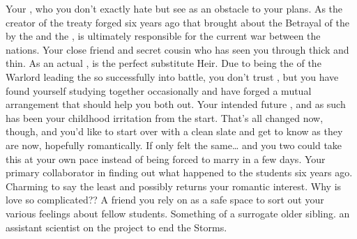 \documentclass[char]{GL2020}
\begin{document}
\begin{contacts}
    \contact{\cDiplomat{}} Your \cDiplomat{\auncle}, who you don’t exactly hate but see as an obstacle to your plans. As the creator of the treaty forged six years ago that brought about the Betrayal of the \pShip{} by the \pTech{} and the \pFarm{}, \cDiplomat{} is ultimately responsible for the current war between the nations.
    \contact{\cAmbition{}} Your close friend and secret cousin who has seen you through thick and thin. As an actual \cHeir{\formal}, \cAmbition{} is the perfect substitute Heir.
    \contact{\cWarlordDaughter{}} Due to \cWarlordDaughter{} being the \cWarlordDaughter{\offspring} of the Warlord leading the \pShippies{} so successfully into battle, you don’t trust \cWarlordDaughter{\them}, but you have found yourself studying together occasionally and have forged a mutual arrangement that should help you both out. 
    \contact{\cChupStudent{}} Your intended future \cChupStudent{\spouse}, and as such has been your childhood irritation from the start. That's all changed now, though, and you'd like to start over with a clean slate and get to know \cChupStudent{\them} as they are now, hopefully romantically. If only \cChupStudent{\they} felt the same\ldots{} and you two could take this at your own pace instead of being forced to marry in a few days.
    \contact{\cPresident{}} Your primary collaborator in finding out what happened to the students six years ago. Charming to say the least and possibly returns your romantic interest. Why is love so complicated??
    \contact{\cAssistantScientist{}} A friend you rely on as a safe space to sort out your various feelings about fellow students. Something of a surrogate older sibling. \cAssistantScientist{\Theyare} an assistant scientist on the project to end the Storms.
\end{contacts}
\end{document}
